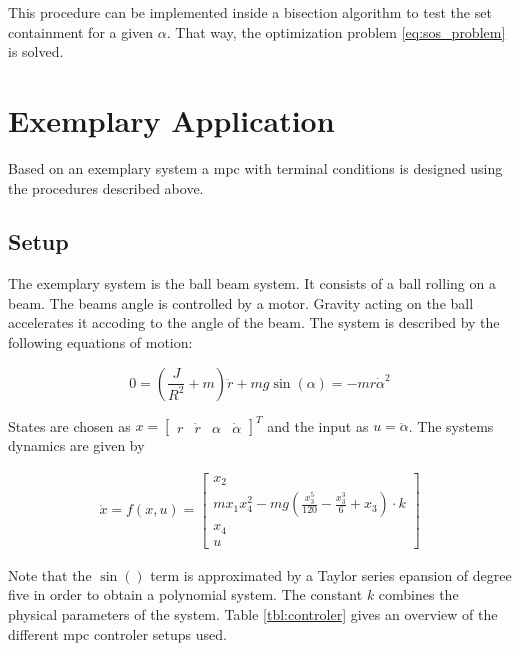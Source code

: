 \documentclass[10pt,a4paper]{article}
\begin{document}
This procedure can be implemented inside a bisection algorithm to test the set containment for a given $\alpha$. That way, the optimization problem \eqref{eq:sos_problem}
is solved.










\section{Exemplary Application}
\label{sec:example}

Based on an exemplary system a \gls{mpc} with terminal conditions is designed using the procedures described above. 


\subsection{Setup}
The exemplary system is the ball beam system.
It consists of a ball rolling on a beam. The beams angle is controlled by a motor. Gravity acting on the ball accelerates it accoding to the angle of the beam.
The system is described by the following equations of motion:

\begin{equation}
    0 = \left(\frac{J}{R^2} + m\right)\ddot{r} + mg\sin(\alpha) = - mr\dot{\alpha}^2
\end{equation}

States are chosen as $x = \begin{bmatrix} r & \dot{r} & \alpha & \dot{\alpha} \end{bmatrix}^T$ and the input as $u = \ddot{\alpha}$. The systems dynamics are given by

\begin{align}
    \dot{x} = f(x,u) = \begin{bmatrix}
        x_2 \\
        m x_1 x_4^2 - m g \left(\frac{x_3^5}{120} - \frac{x_3^3}{6} + x_3\right) \cdot k \\
        x_4 \\
        u
    \end{bmatrix}
\end{align}

Note that the $\sin()$ term is approximated by a Taylor series epansion of degree five in order to obtain a polynomial system.  The constant $k$ combines 
the physical parameters of the system. Table \ref{tbl:controler} gives an overview of the different \gls{mpc} controler setups used.
\end{document}
